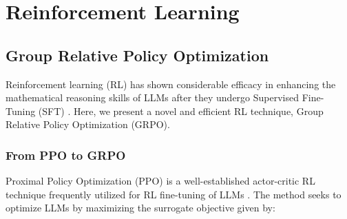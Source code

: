 \section{Reinforcement Learning}

\subsection{Group Relative Policy Optimization} Reinforcement learning (RL) has shown considerable efficacy in enhancing the mathematical reasoning skills of LLMs after they undergo Supervised Fine-Tuning (SFT) \citep{wang2023math,wizardmath}. Here, we present a novel and efficient RL technique, Group Relative Policy Optimization (GRPO).

\subsubsection{From PPO to GRPO} Proximal Policy Optimization (PPO) \citep{schulman2017proximal} is a well-established actor-critic RL technique frequently utilized for RL fine-tuning of LLMs \citep{ouyang2022training}. The method seeks to optimize LLMs by maximizing the surrogate objective given by:

